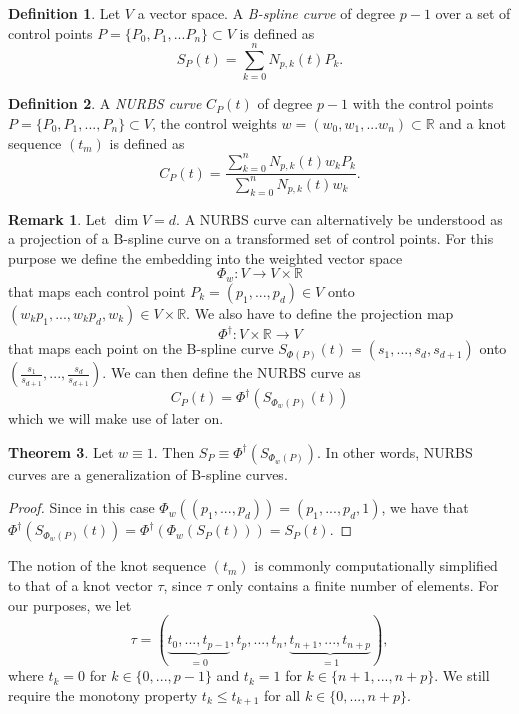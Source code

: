 \documentclass[a4paper, 11pt]{report}
\theoremstyle{definition}
\newtheorem{definition}{Definition}[section]
\newtheorem{theorem}[definition]{Theorem}
\newtheorem*{remark}{Remark}
\renewcommand{\emph}[1]{\textit{#1}}
\begin{document}
\begin{definition}
	Let $V$ a vector space. A \emph{B-spline curve} of degree $p-1$ over a set of control points $P = \{P_0, P_1, ... P_n\} \subset V$ is defined as $$ S_P(t) = \sum_{k=0}^{n} N_{p,k}(t) P_k. $$
\end{definition}

\begin{definition}\label{def:nurbs}
	A \emph{NURBS curve} $C_P(t)$ of degree $p-1$ with the control points $P = \{P_0, P_1, ..., P_n\} \subset V$, the control weights $w = (w_0, w_1, ... w_n) \subset \mathbb{R}$ and a knot sequence $(t_m)$ is defined as
	\begin{equation}
		C_P(t) = \frac{\sum_{k=0}^n N_{p,k}(t) w_k P_k}{\sum_{k=0}^n N_{p,k}(t) w_k}.
	\end{equation}
\end{definition}

\begin{remark}
	Let $\dim V = d$. A NURBS curve can alternatively be understood as a projection of a B-spline curve on a transformed set of control points. For this purpose we define the embedding into the weighted vector space
		$$\Phi_w: V \rightarrow V \times \mathbb{R}$$
	that maps each control point $P_k = (p_1, ..., p_d) \in V$ onto $(w_k p_1, ..., w_k p_d, w_k) \in V \times \mathbb{R}$.
	We also have to define the projection map
		$$\Phi^\dagger: V \times \mathbb{R} \rightarrow V$$ 
	that maps each point on the B-spline curve $S_{\Phi(P)}(t) = (s_1, ..., s_d, s_{d+1})$ onto $(\frac{s_1}{s_{d+1}}, ..., \frac{s_d}{s_{d+1}})$.
	We can then define the NURBS curve as
			$$ C_P(t) = \Phi^\dagger(S_{\Phi_w(P)}(t))$$ 
	which we will make use of later on.
\end{remark}

\begin{theorem}
	Let $w \equiv 1$. Then $S_P \equiv \Phi^\dagger(S_{\Phi_w(P)})$. In other words, NURBS curves are a generalization of B-spline curves.
\end{theorem}
\begin{proof}
	Since in this case $\Phi_w((p_1, ..., p_d)) = (p_1, ..., p_d, 1)$, we have that $\Phi^\dagger(S_{\Phi_w(P)}(t)) = \Phi^\dagger(\Phi_w(S_P(t))) = S_P(t)$.
\end{proof}

The notion of the knot sequence $(t_m)$ is commonly computationally simplified to that of a knot vector $\tau$, since $\tau$ only contains a finite number of elements. For our purposes, we let
	$$\tau = (\underbrace {t_0, ..., t_{p-1}}_{= 0}, t_p, ..., t_n, \underbrace{t_{n+1}, ..., t_{n+p}}_{= 1}),$$
where $t_k = 0$ for $k \in \{0,...,p-1\}$ and $t_k = 1$ for $k \in \{n+1, ..., n+p\}$. We still require the monotony property $t_k \leq t_{k+1}$ for all $k \in \{0, ..., n+p\}$.
\end{document}
